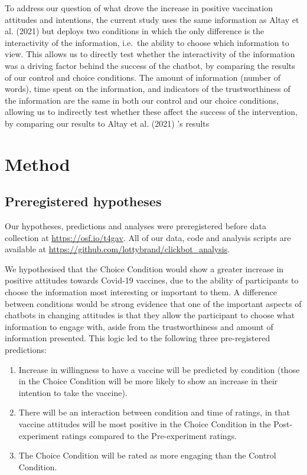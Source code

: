 \documentclass[
  english,
  ,jou,floatsintext]{apa6}
\providecommand{\tightlist}{%
  \setlength{\itemsep}{0pt}\setlength{\parskip}{0pt}}
\begin{document}
To address our question of what drove the increase in positive vaccination attitudes and intentions, the current study uses the same information as Altay et al. (2021) but deploys two conditions in which the only difference is the interactivity of the information, i.e.~the ability to choose which information to view. This allows us to directly test whether the interactivity of the information was a driving factor behind the success of the chatbot, by comparing the results of our control and choice conditions. The amount of information (number of words), time spent on the information, and indicators of the trustworthiness of the information are the same in both our control and our choice conditions, allowing us to indirectly test whether these affect the success of the intervention, by comparing our results to Altay et al. (2021) 's results

\hypertarget{method}{%
\section{Method}\label{method}}

\hypertarget{preregistered-hypotheses}{%
\subsection{Preregistered hypotheses}\label{preregistered-hypotheses}}

Our hypotheses, predictions and analyses were preregistered before data collection at \url{https://osf.io/t4gav}. All of our data, code and analysis scripts are available at \url{https://github.com/lottybrand/clickbot_analysis}.

We hypothesised that the Choice Condition would show a greater increase in positive attitudes towards Covid-19 vaccines, due to the ability of participants to choose the information most interesting or important to them. A difference between conditions would be strong evidence that one of the important aspects of chatbots in changing attitudes is that they allow the participant to choose what information to engage with, aside from the trustworthiness and amount of information presented. This logic led to the following three pre-registered predictions:

\begin{enumerate}
\def\labelenumi{\arabic{enumi})}
\tightlist
\item
  Increase in willingness to have a vaccine will be predicted by condition (those in the Choice Condition will be more likely to show an increase in their intention to take the vaccine).
\item
  There will be an interaction between condition and time of ratings, in that vaccine attitudes will be most positive in the Choice Condition in the Post-experiment ratings compared to the Pre-experiment ratings.
\item
  The Choice Condition will be rated as more engaging than the Control Condition.
\end{enumerate}
\end{document}
